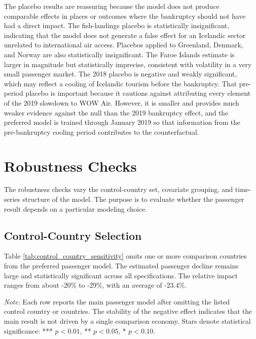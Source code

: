 \documentclass[12pt]{article}
\begin{document}
The placebo results are reassuring because the model does not produce comparable effects in places or outcomes where the bankruptcy should not have had a direct impact. The fish-landings placebo is statistically insignificant, indicating that the model does not generate a false effect for an Icelandic sector unrelated to international air access. Placebos applied to Greenland, Denmark, and Norway are also statistically insignificant. The Faroe Islands estimate is larger in magnitude but statistically imprecise, consistent with volatility in a very small passenger market. The 2018 placebo is negative and weakly significant, which may reflect a cooling of Icelandic tourism before the bankruptcy. That pre-period placebo is important because it cautions against attributing every element of the 2019 slowdown to WOW Air. However, it is smaller and provides much weaker evidence against the null than the 2019 bankruptcy effect, and the preferred model is trained through January 2019 so that information from the pre-bankruptcy cooling period contributes to the counterfactual.

\section{Robustness Checks}\label{app:robustness_checks}

The robustness checks vary the control-country set, covariate grouping, and time-series structure of the model. The purpose is to evaluate whether the passenger result depends on a particular modeling choice.

\subsection{Control-Country Selection}

Table \ref{tab:control_country_sensitivity} omits one or more comparison countries from the preferred passenger model. The estimated passenger decline remains large and statistically significant across all specifications. The relative impact ranges from about -20\% to -29\%, with an average of -23.4\%.

\begin{table}[htbp]\centering\caption{Passenger Effects Under Alternative Control-Country Sets}\label{tab:control_country_sensitivity}\resizebox{\textwidth}{!}{}\par\vspace{0.35em}\noindent\begin{minipage}{0.95\linewidth}\raggedright\scriptsize \textit{Note:} Each row reports the main passenger model after omitting the listed control country or countries. The stability of the negative effect indicates that the main result is not driven by a single comparison economy. Stars denote statistical significance: *** $p<0.01$, ** $p<0.05$, * $p<0.10$.\end{minipage}\end{table}
\end{document}
